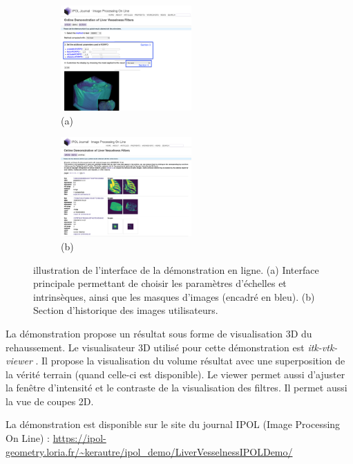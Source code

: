 \begin{figure}[!ht]
    \begin{subfigure}{0.45\textwidth}
        \includegraphics[width=5cm]{Images/visuBenchmarkDemos.png}
        \caption{(a)}
    \end{subfigure}
    \begin{subfigure}{0.45\textwidth}
        \includegraphics[width=5cm]{Images/visuBenchmarkDemosArchivesTrim.png}
        \caption{(b)}
    \end{subfigure}

    \caption{illustration de l'interface de la démonstration en ligne. (a) Interface principale permettant de choisir les paramètres d'échelles et intrinsèques, ainsi que les masques d'images (encadré en bleu). (b) Section d'historique des images utilisateurs.}
\label{Fig:DemoExample}
\end{figure}

La démonstration propose un résultat sous forme de visualisation 3D du rehaussement. Le visualisateur 3D utilisé pour cette démonstration est \textit{itk-vtk-viewer} \cite{Mccormick2020_Visu3DDemo}. Il propose la visualisation du volume résultat avec une superposition de la vérité terrain (quand celle-ci est disponible). Le viewer permet aussi d'ajuster la fenêtre d'intensité et le contraste de la visualisation des filtres. Il permet aussi la vue de coupes 2D.

La démonstration est disponible sur le site du journal IPOL (Image Processing On Line) : \url{https://ipol-geometry.loria.fr/~kerautre/ipol_demo/LiverVesselnessIPOLDemo/}

